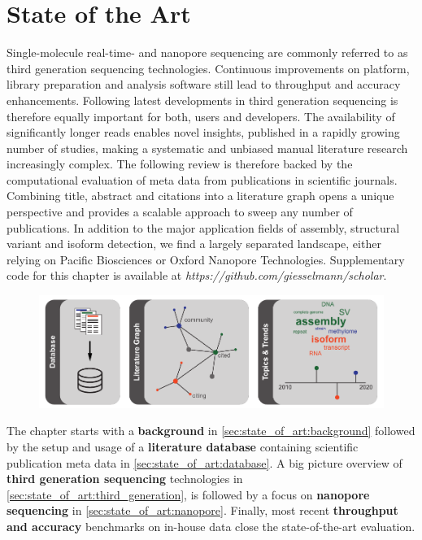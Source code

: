 \chapter{State of the Art}
\label{cha:state_of_art}

Single-molecule real-time- and nanopore sequencing are commonly referred to as third generation sequencing technologies.
Continuous improvements on platform, library preparation and analysis software still lead to throughput and accuracy enhancements.
Following latest developments in third generation sequencing is therefore equally important for both, users and developers.
The availability of significantly longer reads enables novel insights, published in a rapidly growing number of studies, making a systematic and unbiased manual literature research increasingly complex.
The following review is therefore backed by the computational evaluation of meta data from publications in scientific journals.
Combining title, abstract and citations into a literature graph opens a unique perspective and provides a scalable approach to sweep any number of publications.
In addition to the major application fields of assembly, structural variant and isoform detection, we find a largely separated landscape, either relying on Pacific Biosciences or Oxford Nanopore Technologies.
Supplementary code for this chapter is available at \textit{https://github.com/giesselmann/scholar}.

\begin{figure}[h]
	\centering
	\includegraphics[width=1.0\textwidth]{figures/state_of_art/GA.pdf}
	\label{fig:state_of_art:ga}
\end{figure}

The chapter starts with a \textbf{background} in \ref{sec:state_of_art:background} followed by the setup and usage of a \textbf{literature database} containing scientific publication meta data in \ref{sec:state_of_art:database}. A big picture overview of \textbf{third generation sequencing} technologies in \ref{sec:state_of_art:third_generation}, is followed by a focus on \textbf{nanopore sequencing} in \ref{sec:state_of_art:nanopore}. Finally, most recent \textbf{throughput and accuracy} benchmarks on in-house data close the state-of-the-art evaluation.




